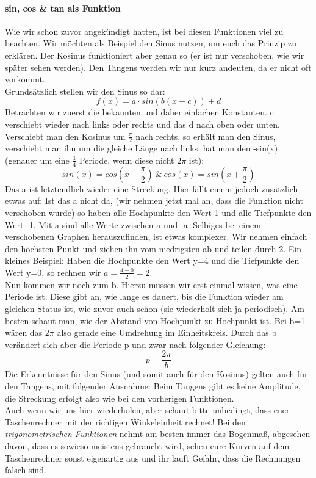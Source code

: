 	\paragraph{sin, cos \& tan als Funktion}
Wie wir schon zuvor angekündigt hatten, ist bei diesen Funktionen viel zu beachten. Wir möchten als Beispiel den Sinus nutzen, um euch das Prinzip zu erklären. Der Kosinus funktioniert aber genau so (er ist nur verschoben, wie wir später sehen werden). Den Tangens werden wir nur kurz andeuten, da er nicht oft vorkommt.\\
Grundsätzlich stellen wir den Sinus so dar:
\[f(x)=a\cdot sin(b(x-c))+d\]	
Betrachten wir zuerst die bekannten und daher einfachen Konstanten. c verschiebt wieder nach links oder rechts und das d nach oben oder unten. Verschiebt man den Kosinus um \(\frac{\pi}{2}\) nach rechts, so erhält man den Sinus, verschiebt man ihn um die gleiche Länge nach links, hat man den -sin(x) (genauer um eine \(\frac{1}{4}\) Periode, wenn diese nicht \(2 \pi\) ist):
\[sin(x)=cos(x-\frac{\pi}{2})\ \&\ cos(x)=sin(x+\frac{\pi}{2})\]
 Das a ist letztendlich wieder eine Streckung. Hier fällt einem jedoch zusätzlich etwas auf: Ist das a nicht da, (wir nehmen jetzt mal an, dass die Funktion nicht verschoben wurde) so haben alle Hochpunkte den Wert 1 und alle Tiefpunkte den Wert -1. Mit a sind alle Werte zwischen a und -a. Selbiges bei einem verschobenen Graphen herauszufinden, ist etwas komplexer. Wir nehmen einfach den höchsten Punkt und ziehen ihn vom niedrigsten ab und teilen durch 2. Ein kleines Beispiel: Haben die Hochpunkte den Wert y=4 und die Tiefpunkte den Wert y=0, so rechnen wir \(a=\frac{4-0}{2}=2\).\\
 Nun kommen wir noch zum b. Hierzu müssen wir erst einmal wissen, was eine Periode ist. Diese gibt an, wie lange es dauert, bis die Funktion wieder am gleichen Status ist, wie zuvor auch schon (sie wiederholt sich ja periodisch). Am besten schaut man, wie der Abstand von Hochpunkt zu Hochpunkt ist. Bei b=1 wären das \(2\pi\) also gerade eine Umdrehung im Einheitskreis. Durch das b verändert sich aber die Periode p und zwar nach folgender Gleichung:
 \[p=\frac{2\pi}{b}\]
 Die Erkenntnisse für den Sinus (und somit auch für den Kosinus) gelten auch für den Tangens, mit folgender Ausnahme: Beim Tangens gibt es keine Amplitude, die Streckung erfolgt also wie bei den vorherigen Funktionen.\\
 Auch wenn wir uns hier wiederholen, aber schaut bitte unbedingt, dass euer Taschenrechner mit der richtigen Winkeleinheit rechnet! Bei den \textit{trigonometrischen Funktionen} nehmt am besten immer das Bogenmaß, abgesehen davon, dass es sowieso meistens gebraucht wird, sehen eure Kurven auf dem Taschenrechner sonst eigenartig aus und ihr lauft Gefahr, dass die Rechnungen falsch sind.

